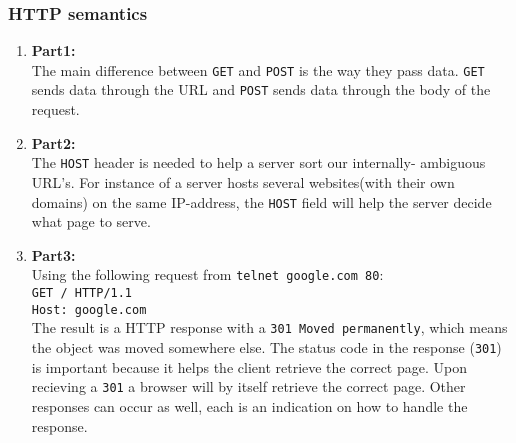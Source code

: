 \documentclass[10pt]{article}
\begin{document}
\subsubsection{HTTP semantics}
\begin{enumerate}
    \item \textbf{Part1:}\\
    The main difference between \texttt{GET} and \texttt{POST} is the way they
    pass data. \texttt{GET} sends data through the URL and \texttt{POST} sends
    data through the body of the request.

    \item \textbf{Part2:}\\
    The \texttt{HOST} header is needed to help a server sort our internally-
    ambiguous URL's. For instance of a server hosts several websites(with their
    own domains) on the same IP-address, the \texttt{HOST} field will help the
    server decide what page to serve.

    \item \textbf{Part3:}\\
    Using the following request from \texttt{telnet google.com 80}:\\
    \texttt{GET / HTTP/1.1\\
            Host: google.com}\\

    The result is a HTTP response with a \texttt{301 Moved permanently}, which
    means the object was moved somewhere else. The status code in the response
    (\texttt{301}) is important because it helps the client retrieve the correct
    page. Upon recieving a \texttt{301} a browser will by itself retrieve the
    correct page. Other responses can occur as well, each is an indication on
    how to handle the response.

\end{enumerate}
\end{document}
